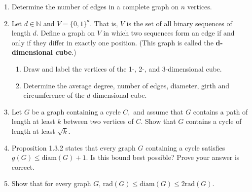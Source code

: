 \documentclass[12pt]{article}
\renewcommand{\emph}[1]{\textsf{\textbf{#1}}}
\newcommand{\bbN}{\mathbb{N}}
\newcommand{\rad}{\text{rad}}
\newcommand{\diam}{\text{diam}}
\begin{document}
\begin{enumerate}
\item Determine the number of edges in a complete graph on $n$ vertices.
\item Let $d \in \bbN$ and $V=\{0,1\}^d.$ That is, $V$ is the set of all binary sequences of length $d.$ Define a graph on $V$ in which two sequences form an edge if and only if they differ in exactly one position. (This graph is called the \emph{d-dimensional cube}.) 
	\begin{enumerate}
	\item Draw and label the vertices of the 1-, 2-, and 3-dimensional cube.
	\item Determine the average degree, number of edges, diameter, girth and circumference of the $d$-dimensional cube.
	\end{enumerate}
\item  Let $G$ be a graph containing a cycle $C,$ and assume that $G$ contains a path of length at least $k$ between two vertices of $C.$ Show that $G$ contains a cycle of length at least $\sqrt{k}$.
\item Proposition 1.3.2 states that every graph $G$ containing a cycle satisfies $g(G) \leq \diam(G) +1.$ Is this bound best possible? Prove your answer is correct.
\item Show that for every graph $G$, $\rad(G) \leq \diam(G) \leq 2\rad(G).$
\end{enumerate}
\end{document}
